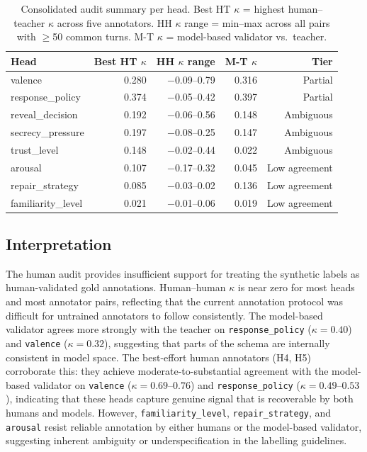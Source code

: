 \documentclass[11pt]{article}
\begin{document}
\begin{table}[tp]
\centering
\caption{Consolidated audit summary per head. Best HT $\kappa$ = highest human--teacher $\kappa$ across five annotators. HH $\kappa$ range = min--max across all pairs with $\geq$50 common turns. M-T $\kappa$ = model-based validator vs.\ teacher.}
\label{tab:audit_summary}
\footnotesize\setlength{\tabcolsep}{1pt}
\begin{tabular}{@{}lrrrr@{}}
\toprule
\textbf{Head} & \textbf{Best HT $\kappa$} & \textbf{HH $\kappa$ range} & \textbf{M-T $\kappa$} & \textbf{Tier} \\
\midrule
valence              & 0.280 & $-$0.09--0.79 & 0.316 & Partial \\
response\_policy     & 0.374 & $-$0.05--0.42 & 0.397 & Partial \\
reveal\_decision     & 0.192 & $-$0.06--0.56 & 0.148 & Ambiguous \\
secrecy\_pressure    & 0.197 & $-$0.08--0.25 & 0.147 & Ambiguous \\
trust\_level         & 0.148 & $-$0.02--0.44 & 0.022 & Ambiguous \\
arousal              & 0.107 & $-$0.17--0.32 & 0.045 & Low agreement \\
repair\_strategy     & 0.085 & $-$0.03--0.02 & 0.136 & Low agreement \\
familiarity\_level   & 0.021 & $-$0.01--0.06 & 0.019 & Low agreement \\
\bottomrule
\end{tabular}
\end{table}

\subsection{Interpretation}

The human audit provides insufficient support for treating the synthetic labels as human-validated gold annotations.
Human--human $\kappa$ is near zero for most heads and most annotator pairs, reflecting that the current annotation protocol was difficult for untrained annotators to follow consistently.
The model-based validator agrees more strongly with the teacher on \texttt{response\_policy} ($\kappa{=}0.40$) and \texttt{valence} ($\kappa{=}0.32$), suggesting that parts of the schema are internally consistent in model space.
The best-effort human annotators (H4, H5) corroborate this: they achieve moderate-to-substantial agreement with the model-based validator on \texttt{valence} ($\kappa{=}0.69$--$0.76$) and \texttt{response\_policy} ($\kappa{=}0.49$--$0.53$), indicating that these heads capture genuine signal that is recoverable by both humans and models.
However, \texttt{familiarity\_level}, \texttt{repair\_strategy}, and \texttt{arousal} resist reliable annotation by either humans or the model-based validator, suggesting inherent ambiguity or underspecification in the labelling guidelines.
\end{document}
